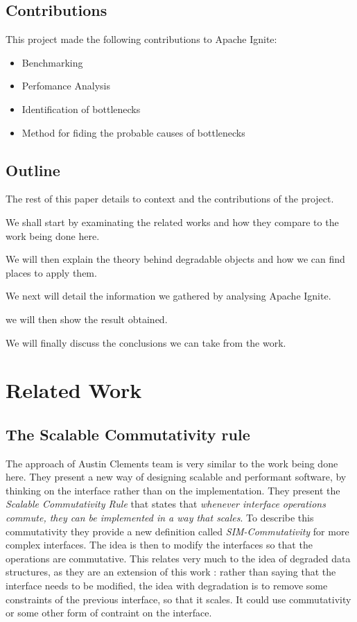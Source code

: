 \documentclass[conference]{IEEEtran}
\begin{document}
\subsection{Contributions}
This project made the following contributions to Apache Ignite:
\begin{itemize}
  \item Benchmarking
  \item Perfomance Analysis
  \item Identification of bottlenecks
  \item Method for fiding the probable causes of bottlenecks
\end{itemize}

\subsection{Outline}
The rest of this paper details to context and the contributions of the project.

We shall start by examinating the related works and how they compare to the work being done here.

We will then explain the theory behind degradable objects and how we can find places to apply them.

We next will detail the information we gathered by analysing Apache Ignite.

we will then show the result obtained.

We will finally discuss the conclusions we can take from the work.


\section{Related Work}
\subsection{The Scalable Commutativity rule}
The approach of Austin Clements \cite{scalable} team is very similar to the work being done here. They present a new way of designing scalable and performant software, by thinking on the interface rather than on the implementation. They present the \textit{Scalable Commutativity Rule} that states that \textit{whenever interface operations commute, they can be implemented in a way that scales}. To describe this commutativity they provide a new definition called \textit{SIM-Commutativity} for more complex interfaces. The idea is then to modify the interfaces so that the operations are commutative. This relates very much to the idea of degraded data structures, as they are an extension of this work : rather than saying that the interface needs to be modified, the idea with degradation is to remove some constraints of the previous interface, so that it scales. It could use commutativity or some other form of contraint on the interface.
\end{document}
